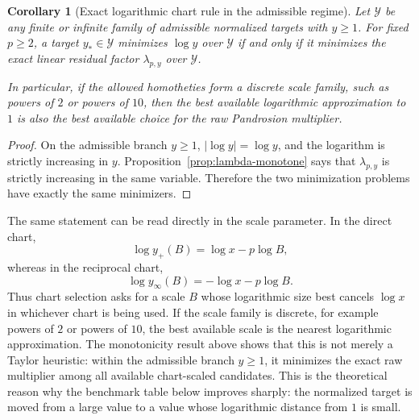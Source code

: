 \documentclass[10pt,a4paper]{article}
\theoremstyle{plain}
\newtheorem{corollary}[theorem]{Corollary}
\theoremstyle{definition}
\theoremstyle{remark}
\begin{document}
\begin{corollary}[Exact logarithmic chart rule in the admissible regime]
\label{cor:log-chart-rule}
Let $\mathcal Y$ be any finite or infinite family of admissible normalized
targets with $y\ge1$.  For fixed $p\ge2$, a target $y_*\in\mathcal Y$ minimizes
$\log y$ over $\mathcal Y$ if and only if it minimizes the exact linear residual
factor $\lambda_{p,y}$ over $\mathcal Y$.

In particular, if the allowed homotheties form a discrete scale family, such as
powers of $2$ or powers of $10$, then the best available logarithmic
approximation to $1$ is also the best available choice for the raw Pandrosion
multiplier.
\end{corollary}

\begin{proof}
On the admissible branch $y\ge1$, $|\log y|=\log y$, and the logarithm is
strictly increasing in $y$.  Proposition~\ref{prop:lambda-monotone} says that
$\lambda_{p,y}$ is strictly increasing in the same variable.  Therefore the two
minimization problems have exactly the same minimizers.
\end{proof}

The same statement can be read directly in the scale parameter.  In the direct
chart,
\[
  \log y_+(B)=\log x-p\log B,
\]
whereas in the reciprocal chart,
\[
  \log y_\infty(B)=-\log x-p\log B.
\]
Thus chart selection asks for a scale $B$ whose logarithmic size best cancels
$\log x$ in whichever chart is being used.  If the scale family is discrete,
for example powers of $2$ or powers of $10$, the best available scale is the
nearest logarithmic approximation.  The monotonicity result above shows that
this is not merely a Taylor heuristic: within the admissible branch $y\ge1$, it
minimizes the exact raw multiplier among all available chart-scaled candidates.
This is the theoretical reason why the benchmark table below improves sharply:
the normalized target is moved from a large value to a value whose logarithmic
distance from $1$ is small.
\end{document}
